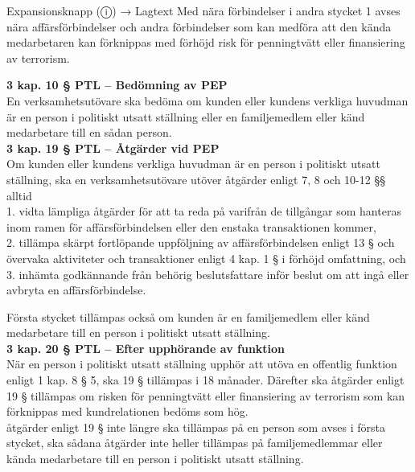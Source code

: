 \documentclass[10pt]{beamer}
\begin{document}
\begin{frame}[label=riskfragor-steg1]
\begin{alertblock}{Expansionsknapp (ⓘ) → Lagtext}
    \tiny Med nära förbindelser i andra stycket 1 avses nära affärsförbindelser och andra förbindelser
     som kan medföra att den kända medarbetaren kan förknippas med förhöjd risk för penningtvätt 
     eller finansiering av terrorism.
    \vspace{0.1cm}
    
    \tiny \textbf{3 kap. 10 § PTL – Bedömning av PEP}\\
    \tiny En verksamhetsutövare ska bedöma om kunden eller kundens verkliga huvudman är en person i politiskt utsatt ställning eller en familjemedlem eller känd medarbetare till en sådan person.\\[0.1cm]

    \tiny \textbf{3 kap. 19 § PTL – Åtgärder vid PEP}\\
    \tiny Om kunden eller kundens verkliga huvudman är en person i politiskt utsatt ställning,
     ska en verksamhetsutövare utöver åtgärder enligt 7, 8 och 10-12 §§ alltid\\
    \tiny  1. vidta lämpliga åtgärder för att ta reda på varifrån de tillgångar som hanteras inom ramen för
     affärsförbindelsen eller den enstaka transaktionen kommer,\\
    \tiny  2. tillämpa skärpt fortlöpande uppföljning av affärsförbindelsen enligt 13 § och övervaka
     aktiviteter och transaktioner enligt 4 kap. 1 § i förhöjd omfattning, och\\
    \tiny  3. inhämta godkännande från behörig beslutsfattare inför beslut om att ingå eller
     avbryta en affärsförbindelse.

    \tiny Första stycket tillämpas också om kunden är en familjemedlem eller känd medarbetare till en
     person i politiskt utsatt ställning.\\[0.1cm]
    
    \tiny \textbf{3 kap. 20 § PTL – Efter upphörande av funktion}\\
    \tiny När en person i politiskt utsatt ställning upphör att utöva en offentlig funktion
     enligt 1 kap. 8 § 5, ska 19 § tillämpas i 18 månader. Därefter ska åtgärder enligt 19 §
    tillämpas om risken för penningtvätt eller finansiering av terrorism som kan förknippas 
    med kundrelationen bedöms som hög.\\

    \tinyOm åtgärder enligt 19 § inte längre ska tillämpas på en person som avses i första stycket,
     ska sådana åtgärder inte heller tillämpas på familjemedlemmar eller kända medarbetare till 
     en person i politiskt utsatt ställning.\\[0.1cm]
    

\end{alertblock}
\end{frame}
\end{document}
